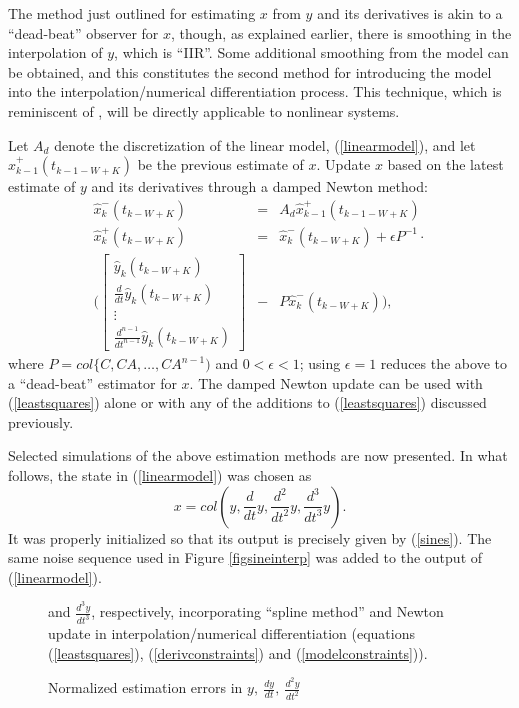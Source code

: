The method just outlined for estimating $x$ from $y$ and its derivatives is akin to
a ``dead-beat'' observer for $x$, though, as explained
earlier, there is smoothing in the
interpolation of $y$, which is ``IIR''.  Some additional smoothing from the
model can be obtained, and this constitutes the second method for introducing
the model into the interpolation/numerical differentiation process.
This technique, which is reminiscent of
\cite{grizzle1990b,moraal1992}, 
will be
directly applicable to nonlinear systems.  

Let $A_d$ denote the discretization of the linear model, (\ref{linearmodel}),
and let $\hat{x}_{k-1}^{+}(t_{k-1-W+K})$ be the previous estimate of $x$.  Update $x$
based on the latest estimate of $y$ and its derivatives through a damped Newton
method:
\begin{eqnarray}
\hat{x}_{k}^{-}(t_{k-W+K}) & = & A_d \hat{x}_{k-1}^{+}(t_{k-1-W+K}) \nonumber \\
\hat{x}_{k}^{+}(t_{k-W+K}) & = & \hat{x}_{k}^{-}(t_{k-W+K}) + 
      \epsilon P^{-1} \cdot \nonumber \\
   ( \left[ \begin{array}{l} 
\hat{y}_{k}(t_{k-W+K}) \\
\frac{d}{dt} \hat{y}_{k}(t_{k-W+K}) \\ 
\vdots \\ 
\frac{d^{n-1}}{dt^{n-1}} \hat{y}_{k}(t_{k-W+K}) \end{array} \right]& -& 
P  \hat{x}_{k}^{-}(t_{k-W+K}) ),\label{newton} 
\end{eqnarray}
where $P=col\{C, CA, \ldots, CA^{n-1})$ and $0 < \epsilon <  1$; using $\epsilon = 1$ reduces the above to a ``dead-beat''
estimator for $x$.  The damped Newton update can be used with
(\ref{leastsquares}) alone or with any of
the additions to (\ref{leastsquares}) discussed previously.

Selected simulations of the above estimation methods are now presented.
In what follows,
the state in (\ref{linearmodel}) was chosen as 
$$ x = col( y,  \frac{d}{dt} y ,  \frac{d^2}{dt^2} y , \frac{d^3}{dt^3} y).$$
It was properly initialized so that its output is precisely
given by (\ref{sines}).  The same noise sequence used in
Figure \ref{figsineinterp} was added to the output of (\ref{linearmodel}).


\begin{figure}[hbt]
\centerline{}

\caption{\small Normalized estimation errors in \protect$y, \ \frac{dy}{dt}, \
\frac{d^2y}{dt^2}$} 
and  \protect$\frac{d^3y}{dt^3}$, respectively, incorporating 
``spline method'' and
Newton update in interpolation/numerical differentiation (equations
(\protect\ref{leastsquares}), (\protect\ref{derivconstraints}) and
(\protect\ref{modelconstraints})).
\label{figsinespline}
\end{figure}


